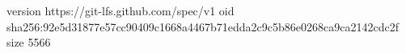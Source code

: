 version https://git-lfs.github.com/spec/v1
oid sha256:92e5d31877e57cc90409c1668a4467b71edda2c9c5b86e0268ca9ca2142cdc2f
size 5566
